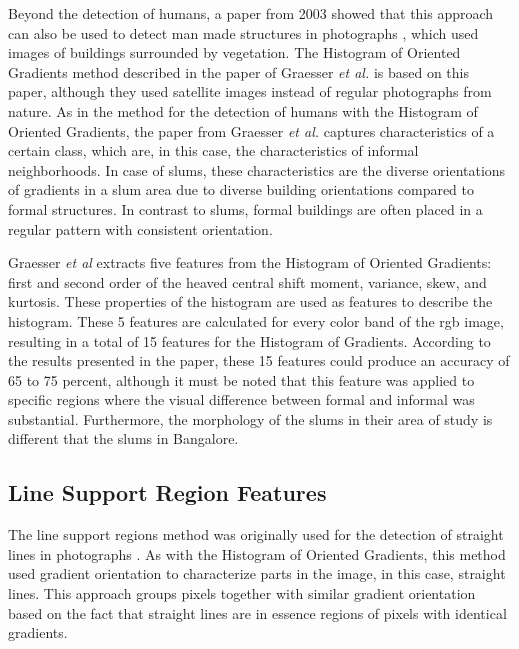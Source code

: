 Beyond the detection of humans, a paper from 2003 showed that this approach can also be used to detect man made structures in photographs \cite{kumar2003man}, which used images of buildings surrounded by vegetation. The Histogram of Oriented Gradients method described in the paper of Graesser \textit{et al.} is based on this paper, although they used satellite images instead of regular photographs from nature. As in the method for the detection of humans with the Histogram of Oriented Gradients, the paper from Graesser \textit{et al.} captures characteristics of a certain class, which are, in this case, the characteristics of informal neighborhoods. In case of slums, these characteristics are the diverse orientations of gradients in a slum area due to diverse building orientations compared to formal structures. In contrast to slums, formal buildings are often placed in a regular pattern with consistent orientation.

Graesser \textit{et al} extracts five features from the Histogram of Oriented Gradients: first and second order of the heaved central shift moment, variance, skew, and kurtosis. These properties of the histogram are used as features to describe the histogram. These 5 features are calculated for every color band of the rgb image, resulting in a total of 15 features for the Histogram of Gradients. According to the results presented in the paper, these 15 features could produce an accuracy of 65 to 75 percent, although it must be noted that this feature was applied to specific regions where the visual difference between formal and informal was substantial. Furthermore, the morphology of the slums in their area of study is different that the slums in Bangalore.


\subsection{Line Support Region Features}

The line support regions method was originally used for the detection of straight lines in photographs \cite{burns1986extracting}. As with the Histogram of Oriented Gradients, this method used gradient orientation to characterize parts in the image, in this case, straight lines. This approach groups pixels together with similar gradient orientation based on the fact that straight lines are in essence regions of pixels with identical gradients. 


